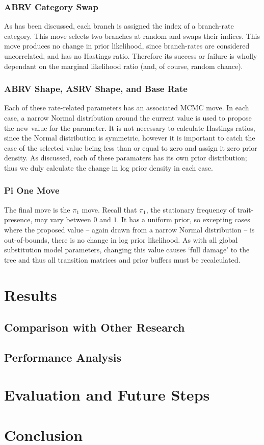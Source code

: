 \documentclass[10pt,journal,compsoc]{IEEEtran}
\begin{document}
\subsubsection{ABRV Category Swap}

As has been discussed, each branch is assigned the index of a branch-rate category. This move selects two branches at random and swaps their indices. This move produces no change in prior likelihood, since branch-rates are considered uncorrelated, and has no Hastings ratio. Therefore its success or failure is wholly dependant on the marginal likelihood ratio (and, of course, random chance).

\subsubsection{ABRV Shape, ASRV Shape, and Base Rate}

Each of these rate-related parameters has an associated MCMC move. In each case, a narrow Normal distribution around the current value is used to propose the new value for the parameter. It is not necessary to calculate Hastings ratios, since the Normal distribution is symmetric, however it is important to catch the case of the selected value being less than or equal to zero and assign it zero prior density. As discussed, each of these paramaters has its own prior distribution; thus we duly calculate the change in log prior density in each case.

\subsubsection{Pi One Move}

The final move is the $\pi_1$ move. Recall that $\pi_1$, the stationary frequency of trait-presence, may vary between $0$ and $1$. It has a uniform prior, so excepting cases where the proposed value -- again drawn from a narrow Normal distribution -- is out-of-bounds, there is no change in log prior likelihood. As with all global substitution model parameters, changing this value causes `full damage' to the tree and thus all transition matrices and prior buffers must be recalculated.

\section{Results}

\subsection{Comparison with Other Research}

\subsection{Performance Analysis}

\section{Evaluation and Future Steps}

\section{Conclusion}

\newpage



\end{document}

